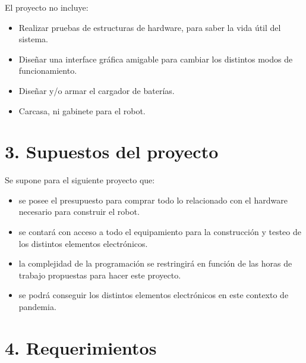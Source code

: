 \documentclass[11pt]{charter}
\begin{document}
El proyecto no incluye:

\begin{itemize}
\item Realizar pruebas de estructuras de hardware, para saber la vida útil del sistema.
\item Diseñar una interface gráfica amigable para cambiar los distintos modos de funcionamiento.
\item Diseñar y/o armar el cargador de baterías.
\item Carcasa, ni gabinete para el robot.
\end{itemize}


\section{3. Supuestos del proyecto}
\label{sec:supuestos}


Se supone para el siguiente proyecto que:
\begin{itemize}
\item se posee el presupuesto para comprar todo lo relacionado con el hardware necesario para construir el robot. 
\item se contará con acceso a todo el equipamiento para la construcción y testeo de los distintos elementos electrónicos.
\item la complejidad de la programación se restringirá en función de las horas de trabajo propuestas para hacer este proyecto.
\item se podrá conseguir los distintos elementos electrónicos en este contexto de pandemia.
\end{itemize}


\section{4. Requerimientos}
\label{sec:requerimientos}

\end{document}
